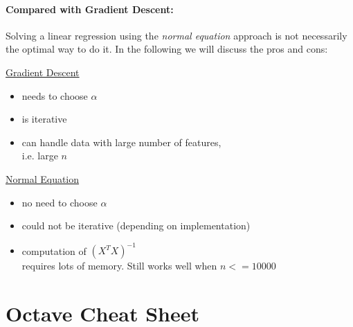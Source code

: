 \documentclass[11pt,a4paper]{article}
\begin{document}
\paragraph{Compared with Gradient Descent:}
Solving a linear regression using the \emph{normal equation} approach is not necessarily the optimal way to do it.
In the following we will discuss the pros and cons:

\begin{multicols}{2}
\underline{Gradient Descent}
\begin{itemize}
\item needs to choose $\alpha$
\item is iterative
\item can handle data with large number of features,\\ i.e. large $n$
\end{itemize}

\columnbreak
\underline{Normal Equation}\\
\begin{itemize}
\item no need to choose $\alpha$
\item could not be iterative (depending on implementation)
\item computation of $(X^TX)^{-1}$\\ requires lots of memory. Still works well when $n <= 10000$
\end{itemize}
\end{multicols}


\section*{Octave Cheat Sheet}
\end{document}
